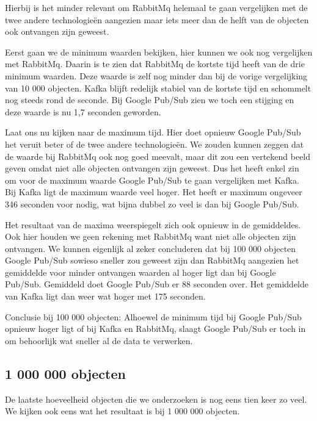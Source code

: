 Hierbij is het minder relevant om RabbitMq helemaal te gaan vergelijken met de twee andere technologieën aangezien maar iets meer dan de helft van de objecten ook ontvangen zijn geweest.

Eerst gaan we de minimum waarden bekijken, hier kunnen we ook nog vergelijken met RabbitMq. Daarin is te zien dat RabbitMq de kortste tijd heeft van de drie minimum waarden. Deze waarde is zelf nog minder dan bij de vorige vergelijking van 10 000 objecten. Kafka blijft redelijk stabiel van de kortste tijd en schommelt nog steeds rond de seconde. Bij Google Pub/Sub zien we toch een stijging en deze waarde is nu 1,7 seconden geworden.

Laat ons nu kijken naar de maximum tijd. Hier doet opnieuw Google Pub/Sub het veruit beter of de twee andere technologieën. We zouden kunnen zeggen dat de waarde bij RabbitMq ook nog goed meevalt, maar dit zou een vertekend beeld geven omdat niet alle objecten ontvangen zijn geweest. Dus het heeft enkel zin om voor de maximum waarde Google Pub/Sub te gaan vergelijken met Kafka. Bij Kafka ligt de maximum waarde veel hoger. Het heeft er maximum ongeveer 346 seconden voor nodig, wat bijna dubbel zo veel is dan bij Google Pub/Sub.

Het resultaat van de maxima weerspiegelt zich ook opnieuw in de gemiddeldes. Ook hier houden we geen rekening met RabbitMq want niet alle objecten zijn ontvangen. We kunnen eigenlijk al zeker concluderen dat bij 100 000 objecten Google Pub/Sub sowieso sneller zou geweest zijn dan RabbitMq aangezien het gemiddelde voor minder ontvangen waarden al hoger ligt dan bij Google Pub/Sub. Gemiddeld doet Google Pub/Sub er 88 seconden over. Het gemiddelde van Kafka ligt dan weer wat hoger met 175 seconden.

Conclusie bij 100 000 objecten: Alhoewel de minimum tijd bij Google Pub/Sub opnieuw hoger ligt of bij Kafka en RabbitMq, slaagt Google Pub/Sub er toch in om behoorlijk wat sneller al de data te verwerken. 

\subsection{1 000 000 objecten}
De laatste hoeveelheid objecten die we onderzoeken is nog eens tien keer zo veel. We kijken ook eens wat het resultaat is bij 1 000 000 objecten.
